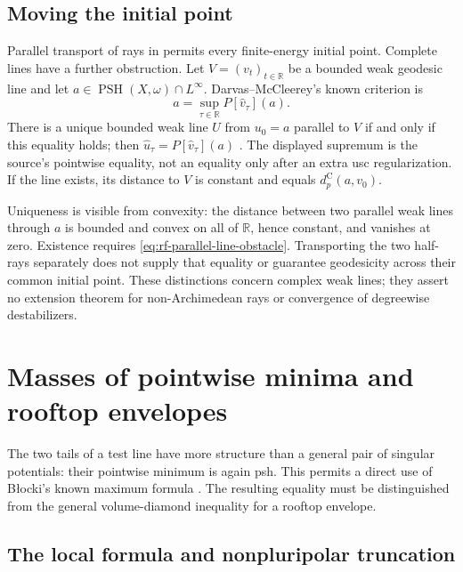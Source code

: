 \subsection{Moving the initial point}

Parallel transport of rays in
 permits every finite-energy
initial point. Complete lines have a further obstruction.
Let $V=(v_t)_{t\in\mathbb R}$ be a bounded weak geodesic
line and let $a\in\operatorname{PSH}(X,\omega)\cap L^\infty$.
Darvas--McCleerey's known criterion is
\[
\tag{65.53}\label{eq:rf-parallel-line-obstacle}
 a=\sup_{\tau\in\mathbb R}P[\widehat v_\tau](a).
\]
There is a unique bounded weak line $U$ from $u_0=a$
parallel to $V$ if and only if this equality holds;
then $\widehat u_\tau=P[\widehat v_\tau](a)$
\cite[Theorems~1.6 and~6.1]{DarvasMcCleerey26Lines}.
The displayed supremum is the source's pointwise equality,
not an equality only after an extra usc regularization.
If the line exists, its distance to $V$ is constant and
equals $d_p^{\mathrm C}(a,v_0)$.

Uniqueness is visible from convexity: the distance between
two parallel weak lines through $a$ is bounded and convex
on all of $\mathbb R$, hence constant, and vanishes at zero.
Existence requires \eqref{eq:rf-parallel-line-obstacle}.
Transporting the two half-rays separately does not supply
that equality or guarantee geodesicity across their common
initial point. These distinctions concern complex weak lines;
they assert no extension theorem for non-Archimedean rays
or convergence of degreewise destabilizers.

\clearpage

\section{Masses of pointwise minima and rooftop envelopes}
\label{sec:rf-minimum-mass}

The two tails of a test line have more structure than a general
pair of singular potentials: their pointwise minimum is again psh.
This permits a direct use of B\l ocki's known maximum formula
\cite[Theorem~4]{Blocki00Product}. The resulting equality must be
distinguished from the general volume-diamond inequality for a
rooftop envelope.

\subsection{The local formula and nonpluripolar truncation}

